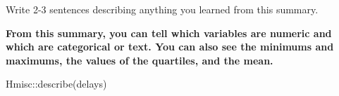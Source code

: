\documentclass[
  letterpaper,
  DIV=11,
  numbers=noendperiod]{scrartcl}
\newenvironment{Shaded}{\begin{snugshade}}{\end{snugshade}}
\newcommand{\FunctionTok}[1]{\textcolor[rgb]{0.28,0.35,0.67}{#1}}
\newcommand{\NormalTok}[1]{\textcolor[rgb]{0.00,0.23,0.31}{#1}}
\newcommand{\SpecialCharTok}[1]{\textcolor[rgb]{0.37,0.37,0.37}{#1}}
\begin{document}
Write 2-3 sentences describing anything you learned from this summary.

\begin{tcolorbox}[enhanced jigsaw, toprule=.15mm, breakable, leftrule=.75mm, bottomrule=.15mm, rightrule=.15mm, colback=white, opacityback=0, colframe=quarto-callout-warning-color-frame, left=2mm, arc=.35mm]

\textbf{From this summary, you can tell which variables are numeric and
which are categorical or text. You can also see the minimums and
maximums, the values of the quartiles, and the mean.}

\end{tcolorbox}

\begin{Shaded}
\begin{Highlighting}[]
\NormalTok{Hmisc}\SpecialCharTok{::}\FunctionTok{describe}\NormalTok{(delays)}
\end{Highlighting}
\end{Shaded}
\end{document}

